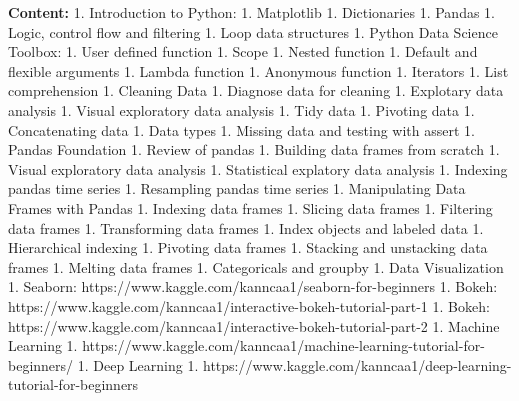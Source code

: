 \documentclass[11pt]{article}
\begin{document}
\textbf{Content:} 1. Introduction to Python: 1. Matplotlib 1.
Dictionaries 1. Pandas 1. Logic, control flow and filtering 1. Loop data
structures 1. Python Data Science Toolbox: 1. User defined function 1.
Scope 1. Nested function 1. Default and flexible arguments 1. Lambda
function 1. Anonymous function 1. Iterators 1. List comprehension 1.
Cleaning Data 1. Diagnose data for cleaning 1. Explotary data analysis
1. Visual exploratory data analysis 1. Tidy data 1. Pivoting data 1.
Concatenating data 1. Data types 1. Missing data and testing with assert
1. Pandas Foundation 1. Review of pandas 1. Building data frames from
scratch 1. Visual exploratory data analysis 1. Statistical explatory
data analysis 1. Indexing pandas time series 1. Resampling pandas time
series 1. Manipulating Data Frames with Pandas 1. Indexing data frames
1. Slicing data frames 1. Filtering data frames 1. Transforming data
frames 1. Index objects and labeled data 1. Hierarchical indexing 1.
Pivoting data frames 1. Stacking and unstacking data frames 1. Melting
data frames 1. Categoricals and groupby 1. Data Visualization 1.
Seaborn: https://www.kaggle.com/kanncaa1/seaborn-for-beginners 1. Bokeh:
https://www.kaggle.com/kanncaa1/interactive-bokeh-tutorial-part-1 1.
Bokeh: https://www.kaggle.com/kanncaa1/interactive-bokeh-tutorial-part-2
1. Machine Learning 1.
https://www.kaggle.com/kanncaa1/machine-learning-tutorial-for-beginners/
1. Deep Learning 1.
https://www.kaggle.com/kanncaa1/deep-learning-tutorial-for-beginners
\end{document}
